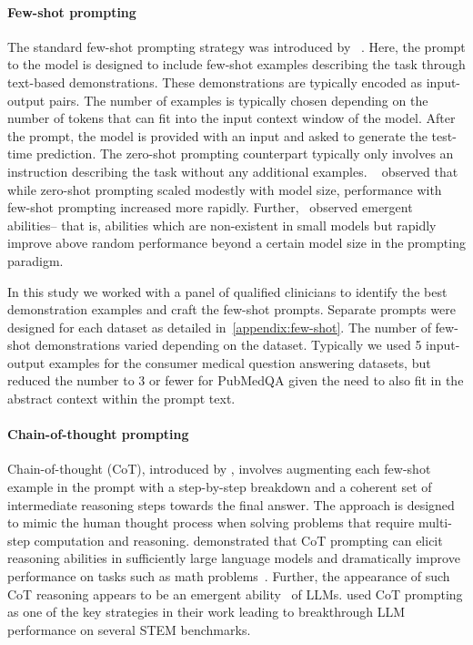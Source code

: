 \paragraph{Few-shot prompting} The standard few-shot prompting strategy was introduced by ~\citet{brown2020language}. Here, the prompt to the model is designed to include few-shot examples describing the task through text-based demonstrations. These demonstrations are typically encoded as input-output pairs. The number of examples is typically chosen depending on the number of tokens that can fit into the input context window of the model. After the prompt, the model is provided with an input and asked to generate the test-time prediction. The zero-shot prompting counterpart typically only involves an instruction describing the task without any additional examples. ~\citet{brown2020language} observed that while zero-shot prompting scaled modestly with model size, performance with few-shot prompting increased more rapidly. Further,~\citet{wei2022emergent} observed emergent abilities– that is, abilities which are non-existent in small models but rapidly improve above random performance beyond a certain model size in the prompting paradigm.

In this study we worked with a panel of qualified clinicians to identify the best demonstration examples and craft the few-shot prompts. Separate prompts were designed for each dataset as detailed in~\ref{appendix:few-shot}. The number of few-shot demonstrations varied depending on the dataset. Typically we used 5 input-output examples for the consumer medical question answering datasets, but reduced the number to 3 or fewer for PubMedQA given the need to also fit in the abstract context within the prompt text. 

\paragraph{Chain-of-thought prompting}\label{cot} Chain-of-thought (CoT), introduced by \citet{wei2022chain}, involves augmenting each few-shot example in the prompt with a step-by-step breakdown and a coherent set of intermediate reasoning steps towards the final answer. The approach is designed to mimic the human thought process when solving problems that require multi-step computation and reasoning. \citet{wei2022chain} demonstrated that CoT prompting can elicit reasoning abilities in sufficiently large language models and dramatically improve performance on tasks such as math problems~\cite{cobbe2021training}. Further, the appearance of such CoT reasoning appears to be an emergent ability~\cite{wei2022emergent} of LLMs. \citet{lewkowycz2022solving} used CoT prompting as one of the key strategies in their work leading to breakthrough LLM performance on several STEM benchmarks. 

